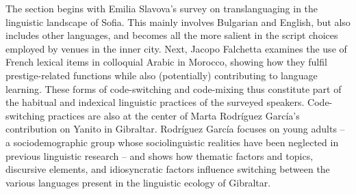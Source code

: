 \documentclass[output=paper
		  ]{langscibook}
\begin{document}
The section begins with Emilia Slavova’s survey on translanguaging in the linguistic landscape of Sofia. This mainly involves Bulgarian and English, but also includes other languages, and becomes all the more salient in the script choices employed by venues in the inner city. Next, Jacopo Falchetta examines the use of French lexical items in colloquial Arabic in Morocco, showing how they fulfil prestige-related functions while also (potentially) contributing to language learning. These forms of code-switching and code-mixing thus constitute part of the habitual and indexical linguistic practices of the surveyed speakers. Code-switching practices are also at the center of Marta Rodríguez García’s contribution on Yanito in Gibraltar. Rodríguez García focuses on young adults – a sociodemographic group whose sociolinguistic realities have been neglected in previous linguistic research – and shows how thematic factors and topics, discursive elements, and idiosyncratic factors influence switching between the various languages present in the linguistic ecology of Gibraltar. 
\end{document}
